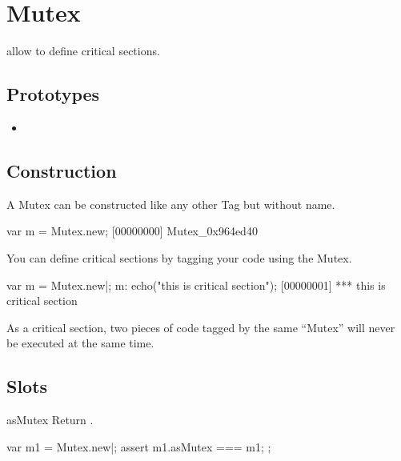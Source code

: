 
\section{Mutex}

 allow to define critical sections.

\subsection{Prototypes}
\begin{itemize}
\item {}
\end{itemize}

\subsection{Construction}
A Mutex can be constructed like any other Tag but without name.

\begin{urbiscript}[firstnumber=1]
var m = Mutex.new;
[00000000] Mutex_0x964ed40
\end{urbiscript}

You can define critical sections by tagging your code using the Mutex.

\begin{urbiscript}[firstnumber=1]
var m = Mutex.new|;
m: echo("this is critical section");
[00000001] *** this is critical section
\end{urbiscript}

As a critical section, two pieces of code tagged by the same ``Mutex''
will never be executed at the same time.

\subsection{Slots}

\begin{urbiscriptapi}
\item[asMutex]  Return \this.
\begin{urbiscript}
var m1 = Mutex.new|;
assert
{
  m1.asMutex === m1;
};
\end{urbiscript}
\end{urbiscriptapi}



